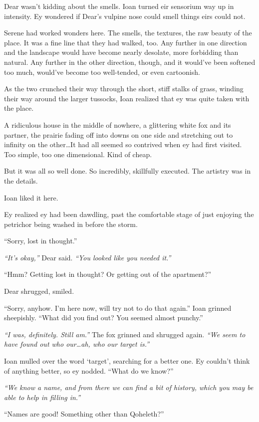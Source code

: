 Dear wasn't kidding about the smells. Ioan turned eir sensorium way up in intensity. Ey wondered if Dear's vulpine nose could smell things eirs could not.

Serene had worked wonders here. The smells, the textures, the raw beauty of the place. It was a fine line that they had walked, too. Any further in one direction and the landscape would have become nearly desolate, more forbidding than natural. Any further in the other direction, though, and it would've been softened too much, would've become too well-tended, or even cartoonish.

As the two crunched their way through the short, stiff stalks of grass, winding their way around the larger tussocks, Ioan realized that ey was quite taken with the place.

A ridiculous house in the middle of nowhere, a glittering white fox and its partner, the prairie fading off into downs on one side and stretching out to infinity on the other\ldots{}It had all seemed so contrived when ey had first visited. Too simple, too one dimensional. Kind of cheap.

But it was all so well done. So incredibly, skillfully executed. The artistry was in the details.

Ioan liked it here.

Ey realized ey had been dawdling, past the comfortable stage of just enjoying the petrichor being washed in before the storm.

``Sorry, lost in thought.''

\emph{``It's okay,''} Dear said. \emph{``You looked like you needed it.''}

``Hmm? Getting lost in thought? Or getting out of the apartment?''

Dear shrugged, smiled.

``Sorry, anyhow. I'm here now, will try not to do that again.'' Ioan grinned sheepishly. ``What did you find out? You seemed almost punchy.''

\emph{``I was, definitely. Still am.''} The fox grinned and shrugged again. \emph{``We seem to have found out who our\ldots{}ah, who our target is.''}

Ioan mulled over the word `target', searching for a better one. Ey couldn't think of anything better, so ey nodded. ``What do we know?''

\emph{``We know a name, and from there we can find a bit of history, which you may be able to help in filling in.''}

``Names are good! Something other than Qoheleth?''

